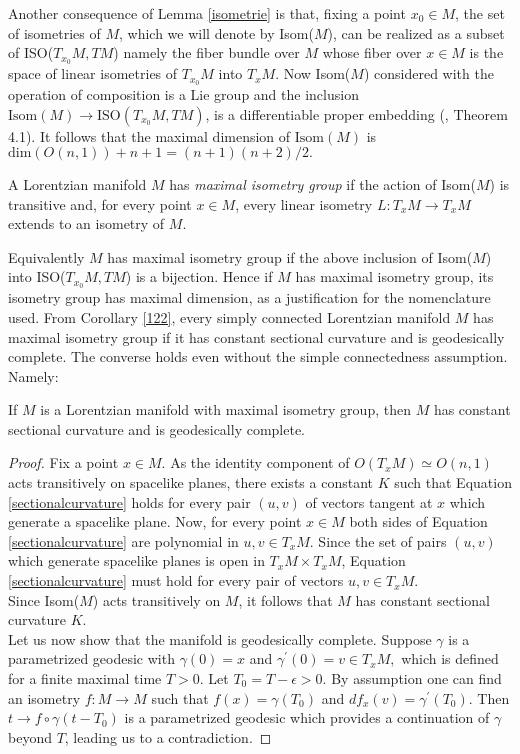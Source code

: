 Another consequence of Lemma \ref{isometrie} is that, fixing a point $x_0 \in M$, the set of isometries of $M$, which we will denote by Isom($M$), can be realized as a subset of ISO($T_{x_0}M, TM$) namely the fiber bundle over $M$ whose fiber over $x\in M$ is the space of linear isometries of $T_{x_0}M$ into $T_{x}M$. Now Isom($M$) considered with the operation of composition is a Lie group and the inclusion $\text{Isom}(M)\to \text{ISO}(T_{x_0}M, TM)$, is a differentiable proper embedding (\cite{okubo_1970}, Theorem 4.1). It follows that the maximal dimension of $\text{Isom}(M)$ is $\text{dim}(O(n,1))+n+1=(n+1)(n+2)/2.$

\begin{definition}
    A Lorentzian manifold $M$ has \textit{maximal isometry group} if the action of Isom($M$) is transitive and, for every point $x \in M$, every linear isometry $L:T_{x}M\to T_xM$ extends to an isometry of $M$. 
\end{definition}

Equivalently $M$ has maximal isometry group if the above inclusion of Isom($M$) into ISO($T_{x_0}M, TM$) is a bijection. Hence if $M$ has maximal isometry group, its isometry group has maximal dimension, as a justification for the nomenclature used. 
From Corollary \ref{122}, every simply connected Lorentzian manifold $M$ has maximal isometry group if it has constant sectional curvature and is geodesically complete. The converse holds even without the simple connectedness assumption. Namely: 

\begin{lemma}\label{maximalisometry}
    If $M$ is a Lorentzian manifold with maximal isometry group, then $M$ has constant sectional curvature and is geodesically complete.
\end{lemma}

\begin{proof}
    Fix a point $x\in M$. As the identity component of $O(T_x M)\simeq O(n,1)$ acts transitively on spacelike planes, there exists a constant $K$ such that Equation \ref{sectionalcurvature} holds for every pair $(u,v)$ of vectors tangent at $x$ which generate a spacelike plane. Now, for every point $x\in M$ both sides of Equation \ref{sectionalcurvature} are polynomial in $u,v \in T_xM$. Since the set of pairs $(u,v)$ which generate spacelike planes is open in $T_{x}M\times T_{x}M$, Equation \ref{sectionalcurvature} must hold for every pair of vectors $u,v \in T_xM$.\\ Since Isom($M$) acts transitively on $M$, it follows that $M$ has constant sectional curvature $K$.\\
    Let us now show that the manifold is geodesically complete. Suppose $\gamma$ is a parametrized geodesic with $\gamma(0)=x$ and $\gamma^{\prime} (0)=v\in T_xM,$ which is defined for a finite maximal time $T>0.$ Let $T_0=T-\epsilon>0.$ By assumption one can find an isometry $f:M\to M$ such that $f(x)=\gamma(T_0)$ and $df_x(v)=\gamma^{\prime}(T_0).$ Then $t\to f\circ\gamma(t-T_0)$ is a parametrized geodesic which provides a continuation of $\gamma$ beyond $T$, leading us to a contradiction. 
\end{proof}


